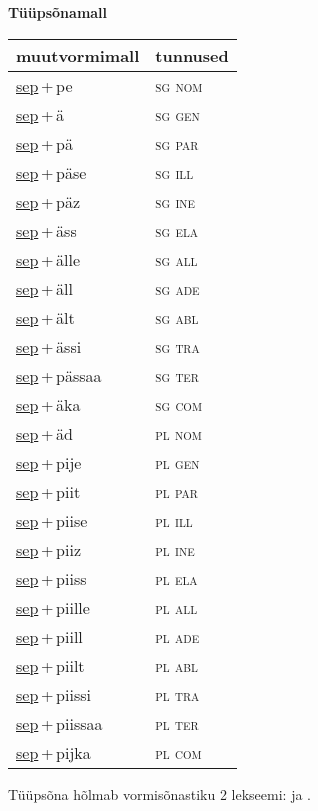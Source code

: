 
\vspace{1.8em}
\begin{minipage}{\textwidth}
\textbf{Tüüpsõnamall \,}\\

\begin{sideways}
\begin{tabular}{l l}
muutvormimall & tunnused \\
\hline
\underline{sep}\,+\,pe & \textsc{ sg nom } \\
\underline{sep}\,+\,ä & \textsc{ sg gen } \\
\underline{sep}\,+\,pä & \textsc{ sg par } \\
\underline{sep}\,+\,päse & \textsc{ sg ill } \\
\underline{sep}\,+\,päz & \textsc{ sg ine } \\
\underline{sep}\,+\,äss & \textsc{ sg ela } \\
\underline{sep}\,+\,älle & \textsc{ sg all } \\
\underline{sep}\,+\,äll & \textsc{ sg ade } \\
\underline{sep}\,+\,ält & \textsc{ sg abl } \\
\underline{sep}\,+\,ässi & \textsc{ sg tra } \\
\underline{sep}\,+\,pässaa & \textsc{ sg ter } \\
\underline{sep}\,+\,äka & \textsc{ sg com } \\
\underline{sep}\,+\,äd & \textsc{ pl nom } \\
\underline{sep}\,+\,pije & \textsc{ pl gen } \\
\underline{sep}\,+\,piit & \textsc{ pl par } \\
\underline{sep}\,+\,piise & \textsc{ pl ill } \\
\underline{sep}\,+\,piiz & \textsc{ pl ine } \\
\underline{sep}\,+\,piiss & \textsc{ pl ela } \\
\underline{sep}\,+\,piille & \textsc{ pl all } \\
\underline{sep}\,+\,piill & \textsc{ pl ade } \\
\underline{sep}\,+\,piilt & \textsc{ pl abl } \\
\underline{sep}\,+\,piissi & \textsc{ pl tra } \\
\underline{sep}\,+\,piissaa & \textsc{ pl ter } \\
\underline{sep}\,+\,pijka & \textsc{ pl com } \\
\end{tabular}
\end{sideways}
\label{tab:tüüpsõnamall-seppe}

\end{minipage}

 
\vspace{1em}
\noindent Tüüpsõna hõlmab vormisõnastiku 2 lekseemi:  ja .
